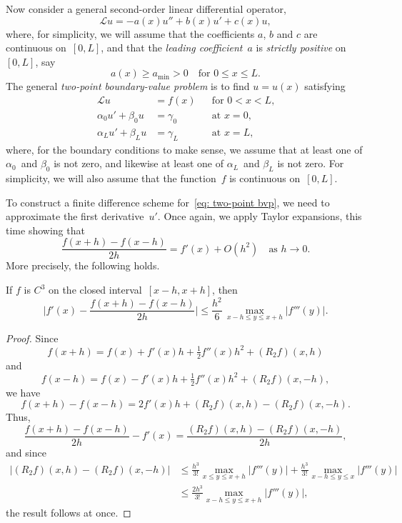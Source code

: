 Now consider a general second-order linear differential operator,
\[
\mathcal{L}u=-a(x)u''+b(x)u'+c(x)u,
\]
where, for simplicity, we will assume that the coefficients $a$, $b$ and 
$c$ are continuous on~$[0,L]$, and that the \emph{leading coefficient}~$a$ is 
\emph{strictly positive} on~$[0,L]$, say
\begin{equation}\label{eq: ellipticity 1d}
a(x)\ge a_{\min}>0\quad\text{for $0\le x\le L$.}
\end{equation}
The general \emph{two-point boundary-value problem} is to find $u=u(x)$ 
satisfying
\begin{equation}\label{eq: two-point bvp}
\begin{aligned}
\mathcal{L}u&=f(x)&&\text{for $0<x<L$,}\\
\alpha_0u'+\beta_0u&=\gamma_0&&\text{at $x=0$,}\\
\alpha_Lu'+\beta_Lu&=\gamma_L&&\text{at $x=L$,}
\end{aligned}
\end{equation}
where, for the boundary conditions to make sense, we assume that at least one 
of $\alpha_0$~and $\beta_0$ is not zero, and likewise at least one of  
$\alpha_L$~and $\beta_L$ is not zero.  For simplicity, we will also assume that 
the function~$f$ is continuous on~$[0,L]$.

To construct a finite difference scheme for~\eqref{eq: two-point bvp}, we need 
to approximate the first derivative~$u'$.  Once again, we apply Taylor 
expansions, this time showing that
\[
\frac{f(x+h)-f(x-h)}{2h}=f'(x)+O(h^2)\quad\text{as $h\to0$.}
\]
More precisely, the following holds.

\begin{theorem}
If $f$ is $C^3$ on the closed interval~$[x-h,x+h]$, then
\[
\biggl|f'(x)-\frac{f(x+h)-f(x-h)}{2h}\biggr|
	\le\frac{h^2}{6}\,\max_{x-h\le y\le x+h}|f'''(y)|.
\]
\end{theorem}
\begin{proof}
Since
\[
f(x+h)=f(x)+f'(x)h+\tfrac12f''(x)h^2+(R_2f)(x,h)
\]
and
\[
f(x-h)=f(x)-f'(x)h+\tfrac12f''(x)h^2+(R_2f)(x,-h),
\]
we have
\[
f(x+h)-f(x-h)=2f'(x)h+(R_2f)(x,h)-(R_2f)(x,-h).
\]
Thus,
\[
\frac{f(x+h)-f(x-h)}{2h}-f'(x)=\frac{(R_2f)(x,h)-(R_2f)(x,-h)}{2h},
\]
and since
\begin{align*}
\bigl|(R_2f)(x,h)-(R_2f)(x,-h)\bigr|
	&\le\frac{h^3}{3!}\max_{x\le y\le x+h}|f'''(y)|
 	   +\frac{h^3}{3!}\max_{x-h\le y\le x}|f'''(y)|\\
	&\le\frac{2h^3}{3!}\max_{x-h\le y\le x+h}|f'''(y)|,
\end{align*}
the result follows at once.
\end{proof}

